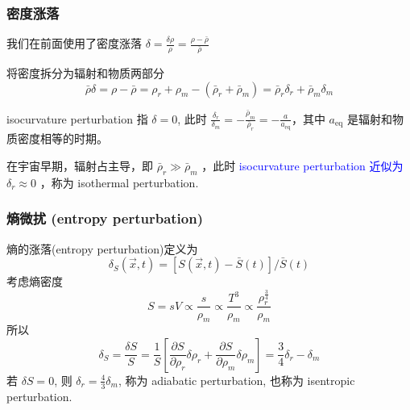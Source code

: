 \documentclass[12pt]{ctexart}
\newcommand{\new}[1]{\textcolor{blue}{#1}}
\begin{document}
\subsubsection{密度涨落}
我们在前面使用了密度涨落 
$\delta = \frac{\delta \rho}{\rho} = \frac{\rho -\bar{\rho}}{\bar{\rho}}$

将密度拆分为辐射和物质两部分
\begin{equation}
    \bar{\rho}\delta = \rho-\bar{\rho} = \rho_r + \rho_m - \left(\bar{\rho}_r + \bar{\rho}_m\right) = \bar{\rho}_r \delta_r + \bar{\rho}_m \delta_m
\end{equation}

isocurvature perturbation 指 $\delta = 0$, 此时 $\frac{\delta_r}{\delta_m} = -\frac{\bar{\rho}_m}{\bar{\rho}_r} = -\frac{a}{a_\text{eq}}$，其中 $a_\text{eq}$ 是辐射和物质密度相等的时期。


在宇宙早期，辐射占主导，即 $\bar{\rho}_r \gg \bar{\rho}_m$ ，此时 \new{isocurvature perturbation 近似为} $\delta_r \approx  0$ ，称为 isothermal perturbation.


\subsubsection{熵微扰 (entropy perturbation)}

熵的涨落(entropy perturbation)定义为
\begin{equation}
    \delta_S\left(\vec{x},t\right) = \left[S\left(\vec{x},t\right)-\bar{S}(t)\right]/\bar{S}(t)
\end{equation}
考虑熵密度
\begin{equation}
    S = sV \propto \frac{s}{\rho_m} \propto \frac{T^3}{\rho_m}  \propto \frac{\rho_r^{\frac{3}{4}}}{\rho_m}
\end{equation}
所以 %
\begin{equation}
    \delta_S = \frac{\delta S}{S} = \frac{1}{S} \left[\frac{\partial S}{\partial \rho_r}\delta \rho_r + \frac{\partial S}{\partial \rho_m}\delta \rho_m\right] = \frac{3}{4}\delta_r -\delta_m
\end{equation}
若 $\delta S=0$, 则 $\delta_r = \frac{4}{3} \delta_m$, 称为 adiabatic perturbation, 也称为 isentropic perturbation.
\end{document}
